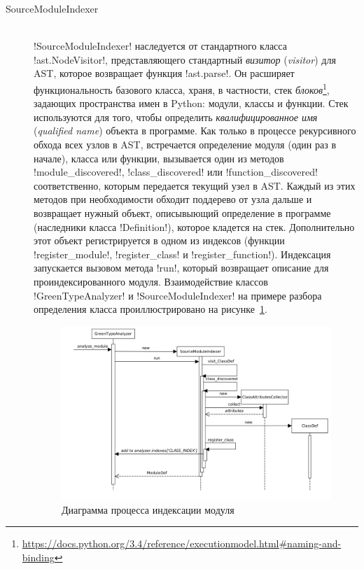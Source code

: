 \begin{description}
  \item[SourceModuleIndexer] \hfill \\ !SourceModuleIndexer! наследуется от
    стандартного класса !ast.NodeVisitor!, представляющего стандартный
    \emph{визитор} (\emph{visitor}) для AST, которое возвращает функция
    !ast.parse!. Он расширяет функциональность базового класса, храня, в
    частности, стек
    \emph{блоков}\footnote{\url{https://docs.python.org/3.4/reference/executionmodel.html\#naming-and-binding}},
    задающих пространства имен в Python: модули, классы и функции. Стек
    используются для того, чтобы определить \emph{квалифицированное имя}
    (\emph{qualified name}) объекта в программе.  Как только в процессе
    рекурсивного обхода всех узлов в AST, встречается определение модуля (один
    раз в начале), класса или функции, вызывается один из методов
    !module_discovered!, !class_discovered! или !function_discovered!
    соответственно, которым передается текущий узел в AST. Каждый из этих
    методов при необходимости обходит поддерево от узла дальше и возвращает
    нужный объект, описывыющий определение в программе (наследники класса
    !Definition!), которое кладется на стек. Дополнительно этот объект
    регистрируется в одном из индексов
    (функции !register_module!, !register_class! и !register_function!).
    Индексация запускается вызовом метода !run!, который возвращает описание
    для проиндексированного модуля. Взаимодействие классов !GreenTypeAnalyzer! и
    !SourceModuleIndexer! на примере разбора определения класса
    проиллюстрировано на рисунке~\ref{fig:indexing-diag}.

  \begin{figure}
  \begin{center}
      \includegraphics[width=\textwidth]{fig/indexing-diag.png}
  \end{center}
  \caption{Диаграмма процесса индексации модуля}
  \label{fig:indexing-diag}
  \end{figure}


\end{description}

